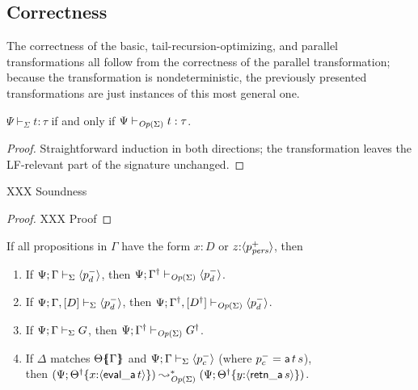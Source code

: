 \subsection{Correctness}

The correctness of the basic, tail-recursion-optimizing, and parallel
transformations all follow from the correctness of the parallel
transformation; because the transformation is nondeterministic, the
previously presented transformations are just instances of this most
general one.

\bigskip
\begin{theorem}
  $\Psi \vdash_\Sigma t : \tau$ if and only if $\Psi
  \vdash_{{\it Op}({\Sigma})} t : \tau$.
\end{theorem}

\begin{proof}
Straightforward induction in both directions; the transformation 
leaves the LF-relevant part of the signature unchanged.
\end{proof}

\begin{theorem}
XXX Soundness
\end{theorem}

\begin{proof}
XXX Proof
\end{proof}

\begin{theorem}
If all propositions in $\Gamma$ have the form 
$x{:}D$ or $z{:}\langle {p^+_{{\it pers}}} \rangle$, then
\begin{enumerate}
\item  
If ${\Psi}; {\Gamma} \vdash_{\Sigma} {\langle {p^-_d} \rangle}$,
then ${\Psi}; {{{\Gamma}^\dag}} \vdash_{{\it Op}({\Sigma})} {\langle {p^-_d} \rangle}$.
\item  
If ${\Psi}; {\Gamma, [D]} \vdash_{\Sigma} {\langle {p^-_d} \rangle}$,
then ${\Psi}; {{{\Gamma}^\dag}, [{{D}^\dag}]} \vdash_{{\it Op}({\Sigma})} {\langle {p^-_d} \rangle}$.
\item  
If ${\Psi}; {\Gamma} \vdash_{\Sigma} {G}$,
then ${\Psi}; {{{\Gamma}^\dag}} \vdash_{{\it Op}({\Sigma})} {{{G}^\dag}}$.
\item
If $\Delta$ matches ${\Theta}\mbox{$\{\hspace{-4pt}\{$}{\Gamma}\mbox{$\}\hspace{-4pt}\}$}$ 
and ${\Psi}; {\Gamma} \vdash_{\Sigma} {\langle {p^-_c} \rangle}$
(where $p^-_c = {\sf a}\,t\,s$),\\
then
$(\Psi; {{{\Theta}^\dag}}\{{x{:}\langle {{\sf eval\_a}\,t} \rangle}\}) 
  \leadsto^*_{{\it Op}({\Sigma})}
 (\Psi; {{{\Theta}^\dag}}\{{y{:}\langle {{\sf retn\_a}\,s} \rangle}\})$.
\end{enumerate}
\end{theorem}

